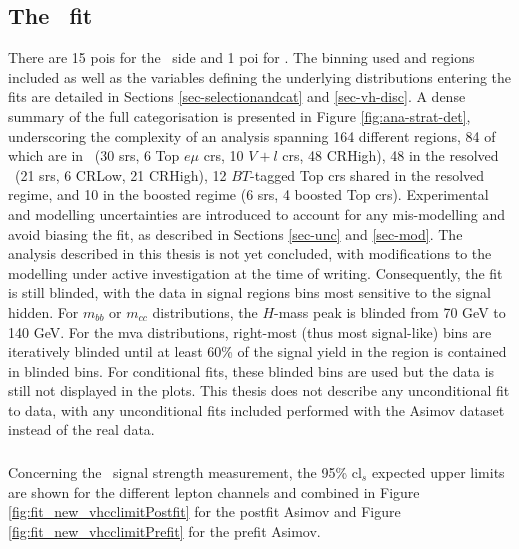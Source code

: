 \subsection[The \vhbc\ Fit]{The \boldvhbc\ fit}\label{subsec-subsecVHBCfit}
There are 15 \gls{poi}s for the \vhb\ side and 1 \gls{poi} for \vhc. The binning used and regions included as well as the variables defining the underlying distributions entering the fits are detailed in Sections \ref{sec-selectionandcat} and \ref{sec-vh-disc}. A dense summary of the full categorisation is presented in Figure \ref{fig:ana-strat-det}, underscoring the complexity of an analysis spanning 164 different regions, 84 of which are in \vhc\ (30 \gls{sr}s, 6 Top $e\mu$ \gls{cr}s, 10 $V+l$ \gls{cr}s, 48 CRHigh), 48 in the resolved \vhb\ (21 \gls{sr}s, 6 CRLow, 21 CRHigh), 12 $BT$-tagged Top \gls{cr}s shared in the resolved regime, and 10 in the boosted regime (6 \gls{sr}s, 4 boosted Top \gls{cr}s). Experimental and modelling uncertainties are introduced to account for any mis-modelling and avoid biasing the fit, as described in Sections \ref{sec-unc} and \ref{sec-mod}. The analysis described in this thesis is not yet concluded, with modifications to the modelling under active investigation at the time of writing. Consequently, the fit is still blinded, with the data in signal regions bins most sensitive to the signal hidden. For $m_{bb}$ or $m_{cc}$ distributions, the $H$-mass peak is blinded from 70 GeV to 140 GeV. For the \gls{mva} distributions, right-most (thus most signal-like) bins are iteratively blinded until at least 60\% of the signal yield in the region is contained in blinded bins. For conditional fits, these blinded bins are used but the data is still not displayed in the plots. This thesis does not describe any unconditional fit to data, with any unconditional fits included performed with the Asimov dataset instead of the real data. %

\subsubsection{\boldvhc}
Concerning the \vhc\ signal strength measurement, the 95\% \gls{cl}$_s$ expected upper limits are shown for the different lepton channels and combined in Figure \ref{fig:fit_new_vhcclimitPostfit} for the postfit Asimov and Figure \ref{fig:fit_new_vhcclimitPrefit} for the prefit Asimov. %

